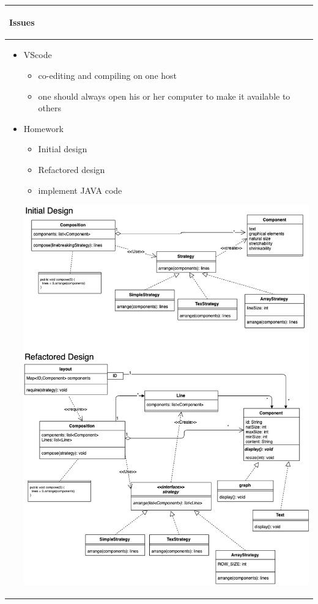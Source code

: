 \documentclass{article}
\begin{document}
\begin{longtable}{|p{\textwidth}|}
\hline
\rowcolor{background}
\begin{center}
\vspace{-1.5em}\textbf{Issues}\vspace{-1em}
\end{center} \\
\hline
\endhead
\begin{itemize}
    \item VScode
    \begin{itemize}
        \item co-editing and compiling on one host 
        \item one should always open his or her computer to make it available to others
    \end{itemize}
    \item Homework
    \begin{itemize}
        \item Initial design
        \item Refactored design
        \item implement JAVA code
    \end{itemize}
    \begin{center}
        \includegraphics[scale=0.5]{SED_HW-(10_31).png}
    \end{center}
\end{itemize}\\
\hline
\end{longtable}
\end{document}
